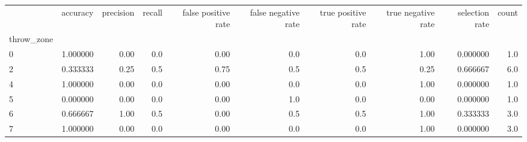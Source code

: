 \begin{tabular}{lrrrrrrrrr}
\toprule
{} &  accuracy &  precision &  recall &  false positive rate &  false negative rate &  true positive rate &  true negative rate &  selection rate &  count \\
throw\_zone &           &            &         &                      &                      &                     &                     &                 &        \\
\midrule
0          &  1.000000 &       0.00 &     0.0 &                 0.00 &                  0.0 &                 0.0 &                1.00 &        0.000000 &    1.0 \\
2          &  0.333333 &       0.25 &     0.5 &                 0.75 &                  0.5 &                 0.5 &                0.25 &        0.666667 &    6.0 \\
4          &  1.000000 &       0.00 &     0.0 &                 0.00 &                  0.0 &                 0.0 &                1.00 &        0.000000 &    1.0 \\
5          &  0.000000 &       0.00 &     0.0 &                 0.00 &                  1.0 &                 0.0 &                0.00 &        0.000000 &    1.0 \\
6          &  0.666667 &       1.00 &     0.5 &                 0.00 &                  0.5 &                 0.5 &                1.00 &        0.333333 &    3.0 \\
7          &  1.000000 &       0.00 &     0.0 &                 0.00 &                  0.0 &                 0.0 &                1.00 &        0.000000 &    3.0 \\
\bottomrule
\end{tabular}

